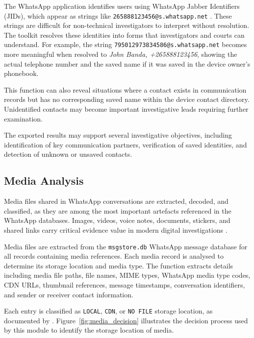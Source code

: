 \documentclass[12pt,a4paper]{report}
\begin{document}
The WhatsApp application identifies users using WhatsApp Jabber Identifiers (JIDs), which appear as strings like \texttt{265888123456@s.whatsapp.net} \citep{lekhac2022book}. These strings are difficult for non-technical investigators to interpret without resolution. The toolkit resolves these identities into forms that investigators and courts can understand. For example, the string \texttt{795012973834586@s.whatsapp.net} becomes more meaningful when resolved to \emph{John Banda, +265888123456}, showing the actual telephone number and the saved name if it was saved in the device owner's phonebook.

This function can also reveal situations where a contact exists in communication records but has no corresponding saved name within the device contact directory. Unidentified contacts may become important investigative leads requiring further examination.

The exported results may support several investigative objectives, including identification of key communication partners, verification of saved identities, and detection of unknown or unsaved contacts.

\subsection{Media Analysis}

Media files shared in WhatsApp conversations are extracted, decoded, and classified, as they are among the most important artefacts referenced in the WhatsApp databases. Images, videos, voice notes, documents, stickers, and shared links carry critical evidence value in modern digital investigations \citep{anglano2014}.

Media files are extracted from the \texttt{msgstore.db} WhatsApp message database for all records containing media references. Each media record is analysed to determine its storage location and media type. The function extracts details including media file paths, file names, MIME types, WhatsApp media type codes, CDN URLs, thumbnail references, message timestamps, conversation identifiers, and sender or receiver contact information.

Each entry is classified as \texttt{LOCAL}, \texttt{CDN}, or \texttt{NO FILE} storage location, as documented by \citet{lekhac2022book}. Figure~\ref{fig:media_decision} illustrates the decision process used by this module to identify the storage location of media.
\end{document}
